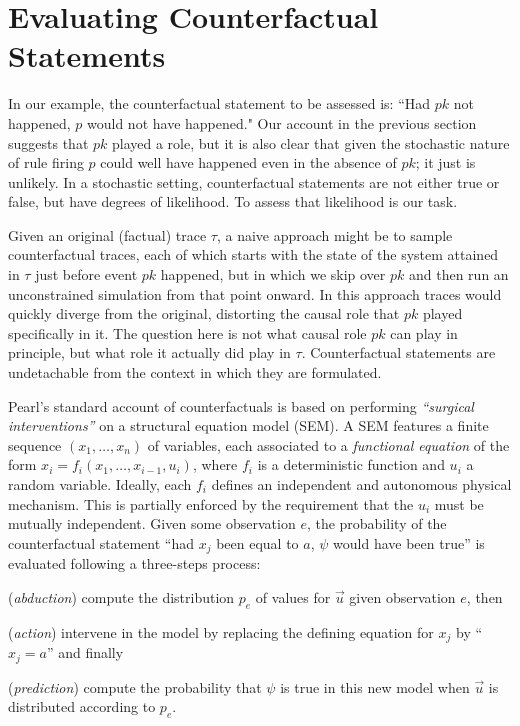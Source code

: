 
\newcommand{\PCFST}[0]{\ProbParen{\CFST{}}}

\newcommand{\ItAbduction}[0]{(\textit{abduction})}
\newcommand{\ItAction}[0]{(\textit{action})}
\newcommand{\ItPrediction}[0]{(\textit{prediction})}


\section{Evaluating Counterfactual
  Statements}\label{sec:counterfactual}

In our example, the counterfactual statement to be assessed is: ``Had
$pk$ not happened, $p$ would not have happened."  Our account in the
previous section suggests that $pk$ played a role, but it is also
clear that given the stochastic nature of rule firing $p$ could well
have happened even in the absence of $pk$; it just is unlikely. In a
stochastic setting, counterfactual statements are not either true or
false, but have degrees of likelihood. To assess that likelihood is
our task.

Given an original (factual) trace $\tau$, a naive approach might be to
sample counterfactual traces, each of which starts with the state of
the system attained in $\tau$ just before event $pk$ happened, but in
which we skip over $pk$ and then run an unconstrained simulation from
that point onward. In this approach traces would quickly diverge from
the original, distorting the causal role that $pk$ played specifically
in it. The question here is not what causal role $pk$ can play in
principle, but what role it actually did play in $\tau$.
Counterfactual statements are undetachable from the context in which
they are formulated.

Pearl's standard account of counterfactuals \cite{pearl2009causality}
is based on performing \textit{``surgical interventions''} on a
structural equation model (SEM). A SEM features a finite sequence
$(x_1, \dots, x_n)$ of variables, each associated to a
\emph{functional equation} of the form
$x_i = f_i(x_1, \dots, x_{i-1}, u_i)$, where $f_i$ is a deterministic
function and $u_i$ a random variable. Ideally, each $f_i$ defines an
independent and autonomous physical mechanism. This is partially
enforced by the requirement that the $u_i$ must be mutually
independent. Given some observation $e$, the probability of the
counterfactual statement ``had $x_j$ been equal to $a$, $\psi$ would
have been true'' is evaluated following a three-steps process:
\begin{inparaenum}[]
\item \ItAbduction{} compute the distribution $p_e$ of values for
  $\vec u$ given observation $e$, then
\item \ItAction{} intervene in the model by replacing the defining
  equation for $x_j$ by ``$x_j = a$'' and finally
\item \ItPrediction{} compute the probability that $\psi$ is true in
  this new model when $\vec{u}$ is distributed according to $p_e$.
\end{inparaenum}

